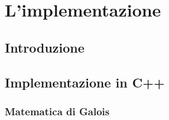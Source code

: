 
\chapter{L'implementazione}






\section{Introduzione}

\textsf{\small } %


\section{Implementazione in C++}

\textsf{\small } %


\subsection{Matematica di Galois}

\textsf{\small } %

